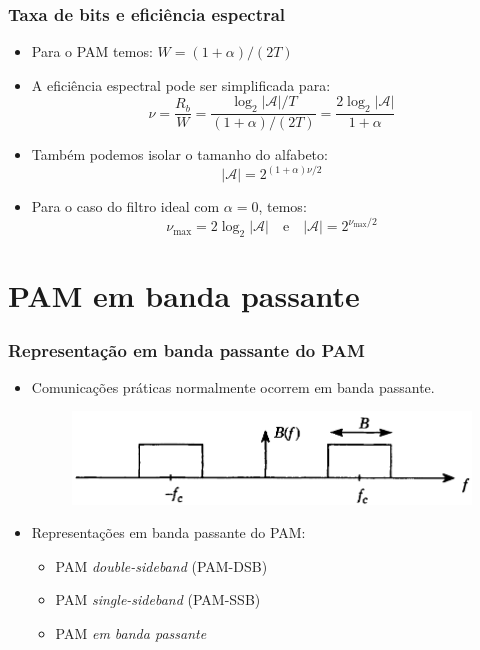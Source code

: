 \begin{frame}
	\frametitle{Taxa de bits e eficiência espectral}

	\begin{itemize}
	  \item Para o PAM temos: $W=(1+\alpha)/(2T)$
	  \item A eficiência espectral pode ser simplificada para:
	  \begin{equation*}
	      \nu = \frac{R_b}{W} = \frac{\log_2 |\mathcal{A}| / T}{(1+\alpha)/(2T)} = \frac{2\log_2 |\mathcal{A}|}{1+\alpha}
	  \end{equation*}
	  \item Também podemos isolar o tamanho do alfabeto:
	  \begin{equation*}
	      |\mathcal{A}| = 2^{(1+\alpha)\nu / 2}
	  \end{equation*}
	  \item Para o caso do filtro ideal com $\alpha=0$, temos:
	  \begin{equation*}
	      \nu_{\text{max}} = 2 \log_2 |\mathcal{A}| \quad \text{e} \quad |\mathcal{A}| =  2^{\nu_{\text{max}} / 2}
	  \end{equation*}  

	\end{itemize}	
\end{frame}


\section{PAM em banda passante}

\begin{frame}
	\frametitle{Representação em banda passante do PAM}

	\begin{itemize}
	  \item Comunicações práticas normalmente ocorrem em banda passante.
	  \begin{figure}[t]	
	    \begin{center}
	      \includegraphics[width=0.6\columnwidth]{figs/pam_13}
	    \end{center}
	  \end{figure}
	  \item Representações em banda passante do PAM:
	  \begin{itemize}
	    \item PAM \textit{double-sideband} (PAM-DSB)
	    \item PAM \textit{single-sideband} (PAM-SSB)
	    \item PAM \textit{em banda passante}
	  \end{itemize}
	\end{itemize}
\end{frame}

